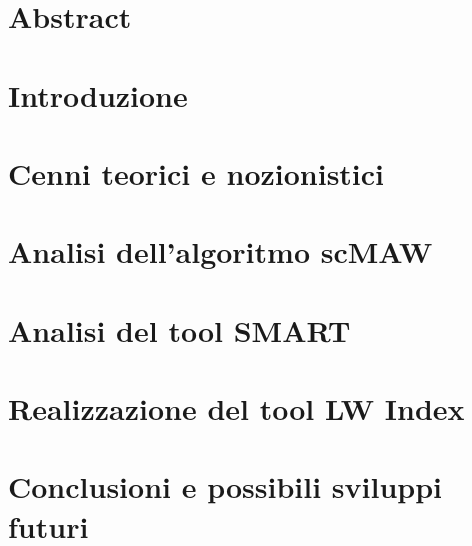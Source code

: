 \documentclass[11pt,oneside,a4paper]{book}
\begin{document}
\newpage
\thispagestyle{empty}
\begin{flushright}
\null{}
{\calligra{}}
\null
\end{flushright}


\newpage
\chapter*{}
\thispagestyle{empty}


\newpage
\thispagestyle{empty}
\begin{flushright}
\null{}
{\calligra{}}
\null
\end{flushright}

\newpage
\tableofcontents
\thispagestyle{empty}

\newpage
\fontsize{14}{21}\selectfont
\setcounter{page}{1}
\chapter*{Abstract}
    
    
\chapter{Introduzione}
    

\chapter{Cenni teorici e nozionistici}
    

\chapter{Analisi dell'algoritmo scMAW}
    

\chapter{Analisi del tool SMART}
    

\chapter{Realizzazione del tool LW Index}
    
    
\chapter{Conclusioni e possibili sviluppi futuri}
    

\printbibliography
\end{document}
